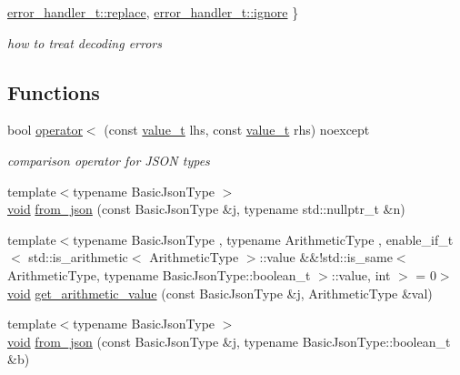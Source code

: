 \begin{DoxyCompactItemize}
\hyperlink{namespacenlohmann_1_1detail_a5a76b60b26dc8c47256a996d18d967dfa9dde360102c103867bd2f45872f1129c}{error\+\_\+handler\+\_\+t\+::replace}, 
\hyperlink{namespacenlohmann_1_1detail_a5a76b60b26dc8c47256a996d18d967dfa567bc1d268f135496de3d5b946b691f3}{error\+\_\+handler\+\_\+t\+::ignore}
 \}\begin{DoxyCompactList}\small\item\em how to treat decoding errors \end{DoxyCompactList}
\end{DoxyCompactItemize}
\subsection*{Functions}
\begin{DoxyCompactItemize}
\item 
bool \hyperlink{namespacenlohmann_1_1detail_a09169efff3bd1771fff29bd92cea19e0}{operator$<$} (const \hyperlink{namespacenlohmann_1_1detail_a1ed8fc6239da25abcaf681d30ace4985}{value\+\_\+t} lhs, const \hyperlink{namespacenlohmann_1_1detail_a1ed8fc6239da25abcaf681d30ace4985}{value\+\_\+t} rhs) noexcept
\begin{DoxyCompactList}\small\item\em comparison operator for J\+S\+ON types \end{DoxyCompactList}\item 
{\footnotesize template$<$typename Basic\+Json\+Type $>$ }\\\hyperlink{namespacenlohmann_1_1detail_a59fca69799f6b9e366710cb9043aa77d}{void} \hyperlink{namespacenlohmann_1_1detail_a1f0395aad0fe853a4539288749d3a603}{from\+\_\+json} (const Basic\+Json\+Type \&j, typename std\+::nullptr\+\_\+t \&n)
\item 
{\footnotesize template$<$typename Basic\+Json\+Type , typename Arithmetic\+Type , enable\+\_\+if\+\_\+t$<$ std\+::is\+\_\+arithmetic$<$ Arithmetic\+Type $>$\+::value \&\&!std\+::is\+\_\+same$<$ Arithmetic\+Type, typename Basic\+Json\+Type\+::boolean\+\_\+t $>$\+::value, int $>$  = 0$>$ }\\\hyperlink{namespacenlohmann_1_1detail_a59fca69799f6b9e366710cb9043aa77d}{void} \hyperlink{namespacenlohmann_1_1detail_a85955b9c6dd31846e4b8e891f78614b6}{get\+\_\+arithmetic\+\_\+value} (const Basic\+Json\+Type \&j, Arithmetic\+Type \&val)
\item 
{\footnotesize template$<$typename Basic\+Json\+Type $>$ }\\\hyperlink{namespacenlohmann_1_1detail_a59fca69799f6b9e366710cb9043aa77d}{void} \hyperlink{namespacenlohmann_1_1detail_a58117f225f43d03e3a0a4a6f3d77c9d9}{from\+\_\+json} (const Basic\+Json\+Type \&j, typename Basic\+Json\+Type\+::boolean\+\_\+t \&b)

\end{DoxyCompactItemize}
